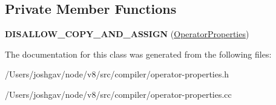\subsection*{Private Member Functions}
\begin{DoxyCompactItemize}
\item 
{\bfseries D\+I\+S\+A\+L\+L\+O\+W\+\_\+\+C\+O\+P\+Y\+\_\+\+A\+N\+D\+\_\+\+A\+S\+S\+I\+GN} (\hyperlink{classv8_1_1internal_1_1compiler_1_1_operator_properties}{Operator\+Properties})\hypertarget{classv8_1_1internal_1_1compiler_1_1_operator_properties_a1135608337e4d8dba5aa884bc99608f2}{}\label{classv8_1_1internal_1_1compiler_1_1_operator_properties_a1135608337e4d8dba5aa884bc99608f2}

\end{DoxyCompactItemize}


The documentation for this class was generated from the following files\+:\begin{DoxyCompactItemize}
\item 
/\+Users/joshgav/node/v8/src/compiler/operator-\/properties.\+h\item 
/\+Users/joshgav/node/v8/src/compiler/operator-\/properties.\+cc\end{DoxyCompactItemize}

